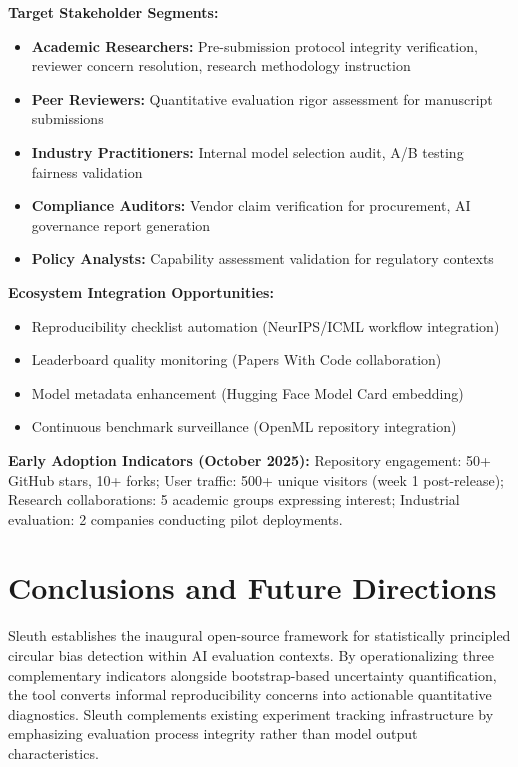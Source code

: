 \documentclass[10pt]{article}
\begin{document}
\textbf{Target Stakeholder Segments:}
\begin{itemize}
    \item \textbf{Academic Researchers:} Pre-submission protocol integrity verification, reviewer concern resolution, research methodology instruction
    \item \textbf{Peer Reviewers:} Quantitative evaluation rigor assessment for manuscript submissions
    \item \textbf{Industry Practitioners:} Internal model selection audit, A/B testing fairness validation
    \item \textbf{Compliance Auditors:} Vendor claim verification for procurement, AI governance report generation
    \item \textbf{Policy Analysts:} Capability assessment validation for regulatory contexts
\end{itemize}

\textbf{Ecosystem Integration Opportunities:}
\begin{itemize}
    \item Reproducibility checklist automation (NeurIPS/ICML workflow integration)
    \item Leaderboard quality monitoring (Papers With Code collaboration)
    \item Model metadata enhancement (Hugging Face Model Card embedding)
    \item Continuous benchmark surveillance (OpenML repository integration)
\end{itemize}

\textbf{Early Adoption Indicators (October 2025):}
Repository engagement: 50+ GitHub stars, 10+ forks; User traffic: 500+ unique visitors (week 1 post-release); Research collaborations: 5 academic groups expressing interest; Industrial evaluation: 2 companies conducting pilot deployments.

\section{Conclusions and Future Directions}

Sleuth establishes the inaugural open-source framework for statistically principled circular bias detection within AI evaluation contexts. By operationalizing three complementary indicators alongside bootstrap-based uncertainty quantification, the tool converts informal reproducibility concerns into actionable quantitative diagnostics. Sleuth complements existing experiment tracking infrastructure by emphasizing evaluation process integrity rather than model output characteristics.
\end{document}
